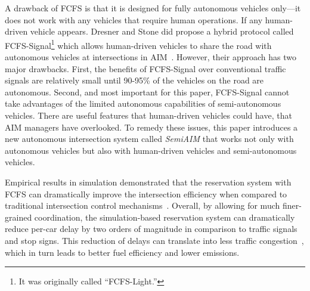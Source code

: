 A drawback of FCFS is that it is designed for fully autonomous
vehicles only---it does not work with any vehicles that require
human operations. If any human-driven vehicle
appears. Dresner and Stone did propose a hybrid protocol called
FCFS-Signal\footnote{It was originally called ``FCFS-Light.''} which
allows human-driven vehicles to share the road with autonomous
vehicles at intersections in AIM~\cite{bib:Dresner07Sharing}. However,
their approach has two major drawbacks.  First, the benefits of
FCFS-Signal over conventional traffic signals are relatively small
until 90-95\% of the vehicles on the road are autonomous.  Second, and
most important for this paper, FCFS-Signal cannot take advantages of
the limited autonomous capabilities of semi-autonomous vehicles. There
are useful features that human-driven vehicles could have, that AIM
managers have overlooked. To remedy these issues, this paper
introduces a new autonomous intersection system called \emph{SemiAIM}
that works not only with autonomous vehicles but also with
human-driven vehicles and semi-autonomous vehicles.


Empirical results in simulation demonstrated that the 
reservation system with FCFS can dramatically improve the intersection
efficiency when compared to traditional intersection control
mechanisms~\cite{bib:Dresner08Multiagent}.  Overall, by
allowing for much finer-grained coordination, the simulation-based
reservation system can dramatically reduce per-car delay by two orders
of magnitude in comparison to traffic signals and stop signs.  This
reduction of delays can translate into less traffic
congestion~\cite{bib:Au10Motion,bib:Quinlan10Bringing}, which in turn
leads to better fuel efficiency and lower emissions.

